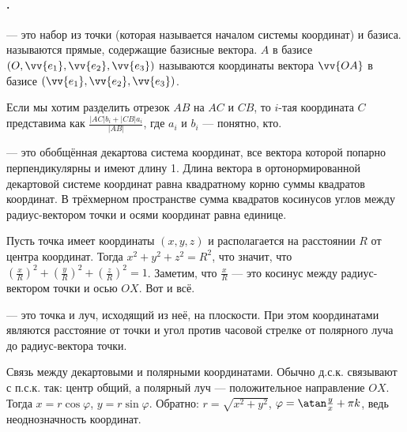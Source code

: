 \documentclass{article}
\let\vec\vv
\begin{document}
    \paragraph{.}
    \begin{itemize}
        \dfn {} --- это набор из точки (которая называется началом системы координат) и базиса.
        \dfn {} называются прямые, содержащие базисные вектора.
        \dfn {} $A$ в базисе $(O,\vec{e_1},\vec{e_2},\vec{e_3})$ называются координаты вектора $\vec{OA}$ в базисе $(\vec{e_1},\vec{e_2},\vec{e_3})$.
        \begin{Example}
            Если мы хотим разделить отрезок $AB$ на $AC$ и $CB$, то $i$-тая координата $C$ представима как $\frac{|AC|b_i+|CB|a_i}{|AB|}$, где $a_i$ и $b_i$ --- понятно, кто.
        \end{Example}
        \dfn {} --- это обобщённая декартова система координат, все вектора которой попарно перпендикулярны и имеют длину 1.
        \thm Длина вектора в ортонормированной декартовой системе координат равна квадратному корню суммы квадратов координат.
        \thm В трёхмерном пространстве сумма квадратов косинусов углов между радиус-вектором точки и осями координат равна единице.
        \begin{Proof}
            Пусть точка имеет координаты $(x,y,z)$ и располагается на расстоянии $R$ от центра координат. Тогда $x^2+y^2+z^2=R^2$, что значит, что $\left(\frac xR\right)^2+\left(\frac yR\right)^2+\left(\frac zR\right)^2=1$. Заметим, что $\frac xR$ --- это косинус между радиус-вектором точки и осью $OX$. Вот и всё.
        \end{Proof}
        \dfn {} --- это точка и луч, исходящий из неё, на плоскости. При этом координатами являются расстояние от точки и угол против часовой стрелке от полярного луча до радиус-вектора точки.
        \begin{Comment}
            Связь между декартовыми и полярными координатами. Обычно д.с.к. связывают с п.с.к. так: центр общий, а полярный луч --- положительное направление $OX$. Тогда $x=r\cos\varphi$, $y=r\sin\varphi$. Обратно: $r=\sqrt{x^2+y^2}$, $\varphi=\atan\frac yx+\pi k$, ведь неоднозначность координат.
        \end{Comment}
        \begin{Example}

\end{Example}
\end{itemize}
\end{document}
